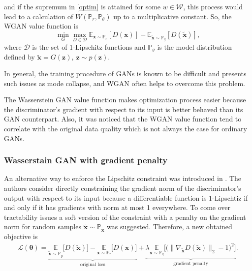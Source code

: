 \documentclass{webofc}
\newcommand{\vx}{\mathbf{x}}
\newcommand{\vz}{\mathbf{z}}
\begin{document}
and if the supremum in \eqref{optim} is attained for some $w \in \mathcal{W}$, this process would lead to a calculation of $W(\mathbb{P}_r, \mathbb{P}_\theta)$ up to a multiplicative constant.
So, the WGAN value function is
\begin{equation}\label{wgan_loss}
\min_G \max_{D \in \mathcal{D}}  \mathbb{E}_{\vx \sim \mathbb{P}_r}  [D(\vx)] - \mathbb{E}_{\tilde{\vx} \sim \mathbb{P}_g} [D(\tilde{\vx})],
\end{equation}
where $\mathcal{D}$ is the set of 1-Lipschitz functions and $\mathbb{P}_g$ is  the model distribution defined by $\tilde{\vx} = G(\vz), ~\vz \sim p(\vz).$

In general, the training procedure of GANs is known to be difficult and presents such issues as mode collapse, and WGAN often helps to overcome this problem.

The Wasserstein GAN value function makes optimization process easier because the discriminator's gradient with respect to its input is better behaved than its GAN counterpart. Also, it was noticed that the WGAN value function tend to correlate with the original data quality which is not always the case for ordinary GANs.


\subsubsection{Wasserstain GAN with gradient penalty}
An alternative way to enforce the Lipschitz constraint was introduced in \cite{gulrajani2017improved}. The authors consider directly constraining the gradient norm of the discriminator's output with respect to its input because a differentiable function is 1-Lipschtiz if and only if it has gradients with norm at most 1 everywhere. To come over tractability issues a soft version of the constraint with a penalty on the gradient norm for random samples $\tilde{\vx} \sim \mathbb{P}_{\tilde{\vx}}$ was suggested. Therefore, a new obtained objective is 
\begin{equation} \label{gpwgan-loss}
\begin{gathered}
\mathcal{L}(\bm{\theta}) =
\underbrace{ \underset{\tilde{\vx} \sim \mathbb{P}_g}{\mathbb{E}}  \Big[D(\tilde{\vx})\Big] - \underset{\vx \sim \mathbb{P}_r}{\mathbb{E}} \Big[D(\vx)\Big]}_{\text{original loss}} + 
\underbrace{ \lambda \underset{\vx \sim \mathbb{P}_g}{\mathbb{E}} \Big[\big(\|\nabla_{\tilde{\vx}} D(\tilde{\vx})\|_2 - 1\big)^2 \Big]}_{\text{gradient penalty}}.
\end{gathered}
\end{equation}
\end{document}
